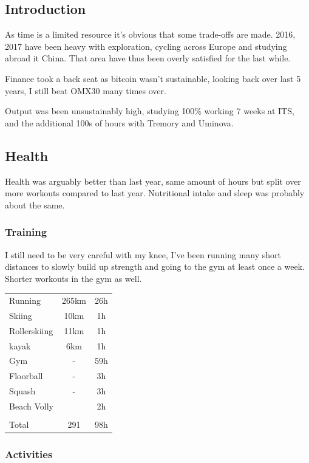 \documentclass[a4paper]{article}
\begin{document}
\subsection{Introduction}

As time is a limited resource it's obvious that some trade-offs are made. 2016, 2017 have been heavy with exploration, cycling across Europe and studying abroad it China. That area have thus been overly satisfied for the last while.

Finance took a back seat as bitcoin wasn't sustainable, looking back over last 5 years, I still beat OMX30 many times over.

Output was been unsustainably high, studying 100\% working 7 weeks at ITS, and the additional 100s of hours with Tremory and Uminova.

\subsection{Health}

Health was arguably better than last year, same amount of hours but split over more workouts compared to last year. Nutritional intake and sleep was probably about the same.
 
\subsubsection{Training}

I still need to be very careful with my knee, I've been running many short distances to slowly build up strength and going to the gym at least once a week. Shorter workouts in the gym as well.

\begin{tabular}{l|c|c}
Running & 265km & 26h\\
Skiing & 10km & 1h\\
Rollerskiing & 11km & 1h\\
kayak & 6km & 1h\\
Gym & - & 59h\\
Floorball & - & 3h\\
Squash & - & 3h\\
Beach Volly &  & 2h\\
\\
Total & 291 & 98h

\end{tabular}

\subsubsection{Activities}
\end{document}
